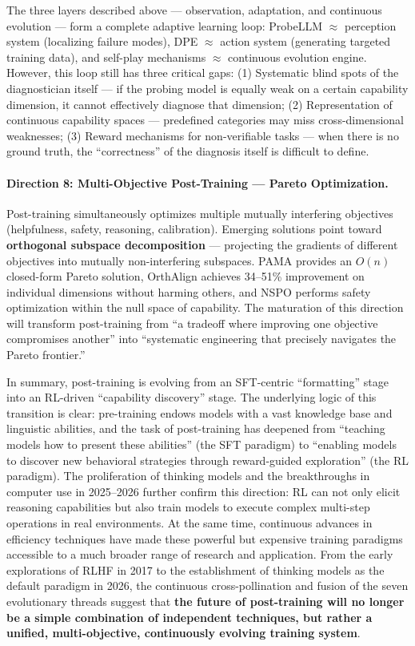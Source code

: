 \noindent
The three layers described above --- observation, adaptation, and continuous evolution --- form a complete adaptive learning loop:
ProbeLLM $\approx$ perception system (localizing failure modes),
DPE $\approx$ action system (generating targeted training data),
and self-play mechanisms $\approx$ continuous evolution engine.
However, this loop still has three critical gaps:
(1) Systematic blind spots of the diagnostician itself ---
if the probing model is equally weak on a certain capability dimension, it cannot effectively diagnose that dimension;
(2) Representation of continuous capability spaces ---
predefined categories may miss cross-dimensional weaknesses;
(3) Reward mechanisms for non-verifiable tasks ---
when there is no ground truth, the ``correctness'' of the diagnosis itself is difficult to define.

\paragraph{Direction 8: Multi-Objective Post-Training --- Pareto Optimization.}
Post-training simultaneously optimizes multiple mutually interfering objectives
(helpfulness, safety, reasoning, calibration).
Emerging solutions point toward \textbf{orthogonal subspace decomposition} ---
projecting the gradients of different objectives into mutually non-interfering subspaces.
PAMA \cite{he2025pama} provides an $O(n)$ closed-form Pareto solution,
OrthAlign \cite{orthalign2025} achieves 34--51\% improvement on individual dimensions without harming others,
and NSPO \cite{nspo2025} performs safety optimization within the null space of capability.
The maturation of this direction will transform post-training from
``a tradeoff where improving one objective compromises another''
into ``systematic engineering that precisely navigates the Pareto frontier.''

\bigskip
\noindent
In summary, post-training is evolving from an SFT-centric ``formatting'' stage
into an RL-driven ``capability discovery'' stage.
The underlying logic of this transition is clear:
pre-training endows models with a vast knowledge base and linguistic abilities,
and the task of post-training has deepened from ``teaching models how to present these abilities'' (the SFT paradigm)
to ``enabling models to discover new behavioral strategies through reward-guided exploration'' (the RL paradigm).
The proliferation of thinking models and the breakthroughs in computer use in 2025--2026 further confirm this direction:
RL can not only elicit reasoning capabilities but also train models to execute complex multi-step operations in real environments.
At the same time, continuous advances in efficiency techniques have made these powerful but expensive training paradigms
accessible to a much broader range of research and application.
From the early explorations of RLHF in 2017 to the establishment of thinking models as the default paradigm in 2026,
the continuous cross-pollination and fusion of the seven evolutionary threads suggest that
\textbf{the future of post-training will no longer be a simple combination of independent techniques,
but rather a unified, multi-objective, continuously evolving training system}.
